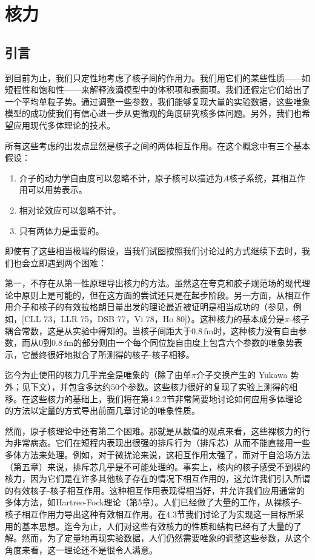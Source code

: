 
\chapter{核力\label{chap:=006838=00529B}}

\section{引言}

到目前为止，我们只定性地考虑了核子间的作用力。我们用它们的某些性质——如短程性和饱和性——来解释液滴模型中的体积项和表面项。我们还假定它们给出了一个平均单粒子势。通过调整一些参数，我们能够复现大量的实验数据，这些唯象模型的成功使我们有信心进一步从更微观的角度研究核多体问题。另外，我们也希望应用现代多体理论的技术。

所有这些考虑的出发点显然是核子之间的两体相互作用。在这个概念中有三个基本假设：
\begin{enumerate}
\item 介子的动力学自由度可以忽略不计，原子核可以描述为$A$核子系统，其相互作用可以用势表示。
\item 相对论效应可以忽略不计。
\item 只有两体力是重要的。
\end{enumerate}
即使有了这些相当极端的假设，当我们试图按照我们讨论过的方式继续下去时，我们也会立即遇到两个困难：

第一，不存在从第一性原理导出核力的方法。虽然这在夸克和胶子规范场的现代理论中原则上是可能的，但在这方面的尝试还只是在起步阶段\cite{De78}。另一方面，从相互作用介子和核子的有效拉格朗日量出发的理论最近被证明是相当成功的（参见，例如，{[}CLL
73，LLR 75，DSB 77，Vi 78，Ho 80{]}）。这种核力的基本成分是$\pi$-核子耦合常数，这是从实验中得知的。当核子间距大于$0.8\,\text{fm}$时，这种核力没有自由参数，而从$0$到$0.8\,\text{fm}$的部分则由一个每个同位旋自由度上包含六个参数的唯象势表示，它最终很好地拟合了所测得的核子-核子相移。

迄今为止使用的核力几乎完全是唯象的（除了由单$\pi$介子交换产生的 Yukawa 势外；见下文），并包含多达约$50$个参数。这些核力很好的复现了实验上测得的相移。在这些核力的基础上，我们将在第4.2.2节非常简要地讨论如何应用多体理论的方法以定量的方式导出前面几章讨论的唯象性质。

然而，原子核理论中还有第二个困难。那就是从数值的观点来看，这些裸核力的行为非常病态。它们在短程内表现出很强的排斥行为（排斥芯）从而不能直接用一些多体方法来处理。例如，对于微扰论来说，这相互作用太强了，而对于自洽场方法（第五章）来说，排斥芯几乎是不可能处理的。事实上，核内的核子感受不到裸的核力，因为它们是在许多其他核子存在的情况下相互作用的，这允许我们引入所谓的有效核子-核子相互作用。这种相互作用表现得相当好，并允许我们应用通常的多体方法，如Hartree-Fock理论（第5章）。人们已经做了大量的工作，从裸核子-核子相互作用力导出这种有效相互作用。在4.3节我们讨论了为实现这一目标所采用的基本思想。迄今为止，人们对这些有效核力的性质和结构已经有了大量的了解。然而，为了定量地再现实验数据，人们仍然需要唯象的调整这些参数，从这个角度来看，这一理论还不是很令人满意。

